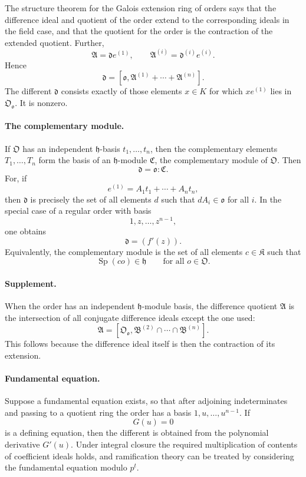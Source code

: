 \documentclass[11pt]{article}
\begin{document}
The structure theorem for the Galois extension ring of orders says that the difference ideal and quotient of the order extend to the corresponding ideals in the field case, and that the quotient for the order is the contraction of the extended quotient. Further,
\[
        \mathfrak A=\mathfrak d e^{(1)},
        \qquad
        \mathfrak A^{(i)}=\mathfrak d^{(i)}e^{(i)}.
\]
Hence
\[
        \mathfrak d=[\mathfrak o,
        \mathfrak A^{(1)}+
        \cdots+\mathfrak A^{(n)}].
\]
The different $\mathfrak d$ consists exactly of those elements $x\in K$ for which $xe^{(1)}$ lies in $\mathfrak O_{\mathfrak o}$. It is nonzero.

\paragraph{The complementary module.}
If $\mathfrak O$ has an independent $\mathfrak h$-basis $t_1,\ldots,t_n$, then the complementary elements $T_1,\ldots,T_n$ form the basis of an $\mathfrak h$-module $\mathfrak C$, the complementary module of $\mathfrak O$. Then
\[
        \mathfrak d=\mathfrak o:\mathfrak C.
\]
For, if
\[
        e^{(1)}=A_1t_1+
        \cdots+A_nt_n,
\]
then $\mathfrak d$ is precisely the set of all elements $d$ such that $dA_i\in\mathfrak o$ for all $i$. In the special case of a regular order with basis
\[
        1,z,\ldots,z^{n-1},
\]
one obtains
\[
        \mathfrak d=(f'(z)).
\]
Equivalently, the complementary module is the set of all elements $c\in\mathfrak K$ such that
\[
        \operatorname{Sp}(co)\in\mathfrak h
        \qquad\text{for all }o\in\mathfrak O.
\]

\paragraph{Supplement.}
When the order has an independent $\mathfrak h$-module basis, the difference quotient $\mathfrak A$ is the intersection of all conjugate difference ideals except the one used:
\[
        \mathfrak A=[\mathfrak O_{\mathfrak o},
        \mathfrak B^{(2)}\cap\cdots\cap\mathfrak B^{(n)}].
\]
This follows because the difference ideal itself is then the contraction of its extension.

\paragraph{Fundamental equation.}
Suppose a fundamental equation exists, so that after adjoining indeterminates and passing to a quotient ring the order has a basis $1,u,\ldots,u^{n-1}$. If
\[
        G(u)=0
\]
is a defining equation, then the different is obtained from the polynomial derivative $G'(u)$. Under integral closure the required multiplication of contents of coefficient ideals holds, and ramification theory can be treated by considering the fundamental equation modulo $p^t$.
\end{document}
